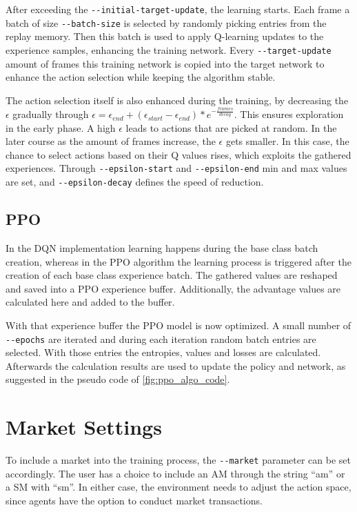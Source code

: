After exceeding the \verb|--initial-target-update|, the learning starts. Each frame a batch of size \verb|--batch-size| is selected by randomly picking entries from the replay memory. Then this batch is used to apply Q-learning updates to the experience samples, enhancing the training network. Every \verb|--target-update| amount of frames this training network is copied into the target network to enhance the action selection while keeping the algorithm stable.

The action selection itself is also enhanced during the training, by decreasing the $\epsilon$ gradually through $\epsilon = \epsilon_{end}+(\epsilon_{start}-\epsilon_{end})*e^{-\frac{frames}{decay}}$. This ensures exploration in the early phase. A high $\epsilon$ leads to actions that are picked at random. In the later course as the amount of frames increase, the $\epsilon$ gets smaller. In this case, the chance to select actions based on their Q values rises, which exploits the gathered experiences. Through \verb|--epsilon-start| and \verb|--epsilon-end| min and max values are set, and \verb|--epsilon-decay| defines the speed of reduction.

\subsection{PPO}
In the DQN implementation learning happens during the base class batch creation, whereas in the PPO algorithm the learning process is triggered after the creation of each base class experience batch. The gathered values are reshaped and saved into a PPO experience buffer. Additionally, the advantage values are calculated here and added to the buffer.

With that experience buffer the PPO model is now optimized. A small number of \verb|--epochs| are iterated and during each iteration random batch entries are selected. With those entries the entropies, values and losses are calculated. Afterwards the calculation results are used to update the policy and network, as suggested in the pseudo code of \ref{fig:ppo_algo_code}.

\section{Market Settings}\label{market_settings}
To include a market into the training process, the \verb|--market| parameter can be set accordingly. The user has a choice to include an AM through the string ``am'' or a SM with ``sm''. In either case, the environment needs to adjust the action space, since agents have the option to conduct market transactions.

